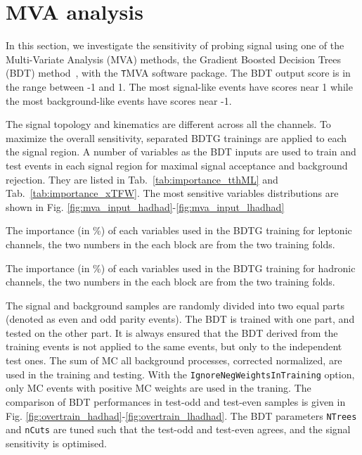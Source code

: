 \section{MVA analysis}
\label{sec:mva}

In this section, we investigate the sensitivity of probing signal using one of the Multi-Variate Analysis (MVA) methods, the Gradient Boosted Decision Trees (BDT) method~\cite{BDT,BDT2}, with the {\texttt TMVA} software package. The BDT output score is in the range between -1 and 1. The most signal-like events have scores near 1 while the most background-like events have scores near -1.

The signal topology and kinematics are different across all the channels. To maximize the overall sensitivity, separated BDTG trainings are applied to each the signal region. A number of variables as the BDT inputs are used to train and test events in each signal region for maximal signal acceptance and background rejection. They are listed in Tab.~\ref{tab:importance_tthML} and Tab.~\ref{tab:importance_xTFW}. The most sensitive variables distributions are shown in Fig. \ref{fig:mva_input_hadhad}-\ref{fig:mva_input_lhadhad}

\begin{table}
\caption{The importance (in \%) of each variables used in the BDTG training for leptonic channels, the two numbers in the each block are from the two training folds.}
\label{tab:importance_tthML}

\end{table}


\begin{table}
\caption{The importance (in \%) of each variables used in the BDTG training for hadronic channels, the two numbers in the each block are from the two training folds.}
\label{tab:importance_xTFW}

\end{table}

The signal and background samples are randomly divided into two equal parts (denoted as even and odd parity events). The BDT is trained with one part, and tested on the other part. It is always ensured that the BDT derived from the training events is not applied to the same events, but only to the independent test ones. The sum of MC all background processes, corrected normalized, are used in the training and testing. %
With the \texttt{IgnoreNegWeightsInTraining} option, only MC events with positive MC weights are used in the traning. The comparison of BDT performances in test-odd and test-even samples is given in Fig. \ref{fig:overtrain_hadhad}-\ref{fig:overtrain_lhadhad}. The BDT parameters \texttt{NTrees} and \texttt{nCuts} are tuned such that the test-odd and test-even agrees, and the signal sensitivity is optimised.

